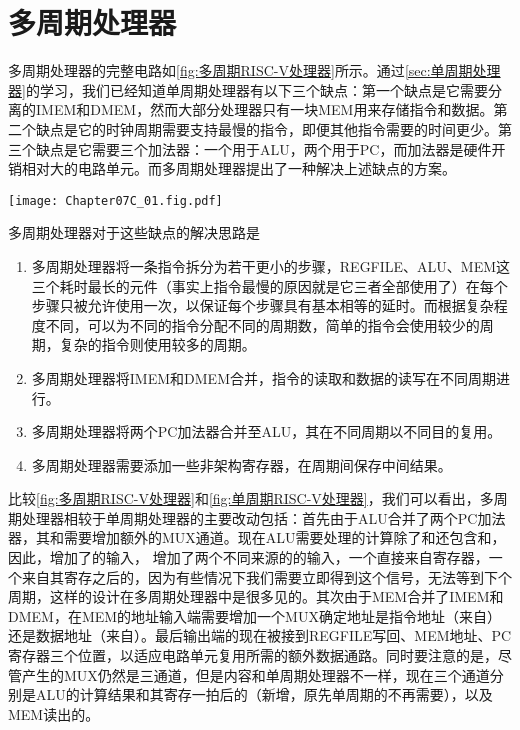 \section{多周期处理器}

多周期处理器的完整电路如\cref{fig:多周期RISC-V处理器}所示。通过\cref{sec:单周期处理器}的学习，我们已经知道单周期处理器有以下三个缺点：第一个缺点是它需要分离的IMEM和DMEM，然而大部分处理器只有一块MEM用来存储指令和数据。第二个缺点是它的时钟周期需要支持最慢的指令，即便其他指令需要的时间更少。第三个缺点是它需要三个加法器：一个用于ALU，两个用于PC，而加法器是硬件开销相对大的电路单元。而多周期处理器提出了一种解决上述缺点的方案。
\begin{Figure}
    \texttt{[image: Chapter07C\_01.fig.pdf]}
\end{Figure}

多周期处理器对于这些缺点的解决思路是
\begin{enumerate}
    \item 多周期处理器将一条指令拆分为若干更小的步骤，REGFILE、ALU、MEM这三个耗时最长的元件（事实上指令最慢的原因就是它三者全部使用了）在每个步骤只被允许使用一次，以保证每个步骤具有基本相等的延时。而根据复杂程度不同，可以为不同的指令分配不同的周期数，简单的指令会使用较少的周期，复杂的指令则使用较多的周期。
    \item 多周期处理器将IMEM和DMEM合并，指令的读取和数据的读写在不同周期进行。
    \item 多周期处理器将两个PC加法器合并至ALU，其在不同周期以不同目的复用。
    \item 多周期处理器需要添加一些非架构寄存器，在周期间保存中间结果。
\end{enumerate}
比较\cref{fig:多周期RISC-V处理器}和\cref{fig:单周期RISC-V处理器}，我们可以看出，多周期处理器相较于单周期处理器的主要改动包括：首先由于ALU合并了两个PC加法器，其和需要增加额外的MUX通道。现在ALU需要处理的计算除了和还包含和，因此，增加了的输入， 增加了两个不同来源的的输入，一个直接来自寄存器，一个来自其寄存之后的，因为有些情况下我们需要立即得到这个信号，无法等到下个周期，这样的设计在多周期处理器中是很多见的。其次由于MEM合并了IMEM和DMEM，在MEM的地址输入端需要增加一个MUX确定地址是指令地址（来自）还是数据地址（来自）。最后输出端的现在被接到REGFILE写回、MEM地址、PC寄存器三个位置，以适应电路单元复用所需的额外数据通路。同时要注意的是，尽管产生的MUX仍然是三通道，但是内容和单周期处理器不一样，现在三个通道分别是ALU的计算结果和其寄存一拍后的（新增，原先单周期的不再需要），以及MEM读出的。

